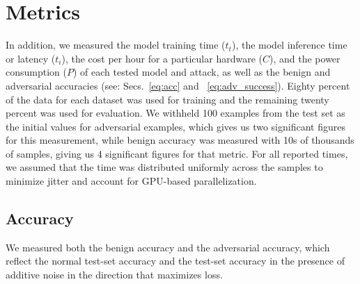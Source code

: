 \documentclass[conference]{IEEEtran}
\begin{document}
\section{Metrics}

 In addition, we measured the model training time ($t_{t}$), the model inference time or latency ($t_{i}$), the cost per hour for a particular hardware ($C$), and the power consumption ($P$) of each tested model and attack, as well as the benign and adversarial accuracies (see: Secs.~\ref{eq:acc} and ~\ref{eq:adv_success}). Eighty percent of the data for each dataset was used for training and the remaining twenty percent was used for evaluation. We withheld 100 examples from the test set as the initial values for adversarial examples, which gives us two significant figures for this measurement, while benign accuracy was measured with 10s of thousands of samples, giving us 4 significant figures for that metric. For all reported times, we assumed that the time was distributed uniformly across the samples to minimize jitter and account for GPU-based parallelization.

\subsection{Accuracy}
We measured both the benign accuracy and the adversarial accuracy, which reflect the normal test-set accuracy and the test-set accuracy in the presence of additive noise in the direction that maximizes loss.


\end{document}
